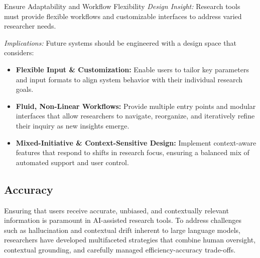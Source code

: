 
\begin{designRecom}{Ensure Adaptability and Workflow Flexibility} \textit{Design Insight:}
Research tools must provide flexible workflows and customizable interfaces to address varied researcher needs.

\smallskip

\textit{Implications:}
Future systems should be engineered with a design space that considers:
\begin{itemize}
\item \textbf{Flexible Input \& Customization:}
Enable users to tailor key parameters and input formats to align system behavior with their individual research goals.
\item \textbf{Fluid, Non-Linear Workflows:} Provide multiple entry points and modular interfaces that allow researchers to navigate, reorganize, and iteratively refine their inquiry as new insights emerge.
\item \textbf{Mixed-Initiative \& Context-Sensitive Design:}  Implement context-aware features that respond to shifts in research focus, ensuring a balanced mix of automated support and user control.
\end{itemize}

\end{designRecom}

\subsection{Accuracy} 
\label{sec:accuracy} 
Ensuring that users receive accurate, unbiased, and contextually relevant information is paramount in AI-assisted research tools. To address challenges such as hallucination and contextual drift inherent to large language models, researchers have developed multifaceted strategies that combine human oversight, contextual grounding, and carefully managed efficiency-accuracy trade-offs.

